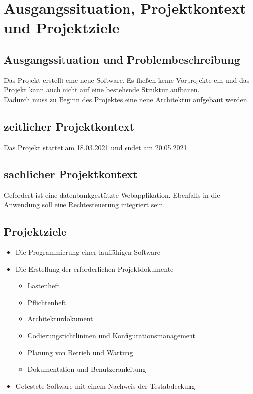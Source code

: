
\chapter{Ausgangssituation, Projektkontext und Projektziele}
\section{Ausgangssituation und Problembeschreibung}
Das Projekt erstellt eine neue Software. Es fließen keine Vorprojekte ein und das Projekt kann auch nicht auf eine bestehende Struktur aufbauen. \\
Dadurch muss zu Beginn des Projektes eine neue Architektur aufgebaut werden. \\
\section{zeitlicher Projektkontext}
Das Projekt startet am 18.03.2021 und endet am 20.05.2021.
\section{sachlicher Projektkontext}
Gefordert ist eine datenbankgestützte Webapplikation. Ebenfalls in die Anwendung soll eine Rechtesteuerung integriert sein.
\section{Projektziele}
\begin{itemize}
\item Die Programmierung einer lauffähigen Software 
\item Die Erstellung der erforderlichen Projektdokumente
	\begin{itemize}
	\item Lastenheft
	\item Pflichtenheft
	\item Architekturdokument
	\item Codierungsrichtlininen und Konfigurationsmanagement
	\item Planung von Betrieb und Wartung
	\item Dokumentation und Benutzeranleitung
	\end{itemize}
\item Getestete Software mit einem Nachweis der Testabdeckung
\end{itemize}


